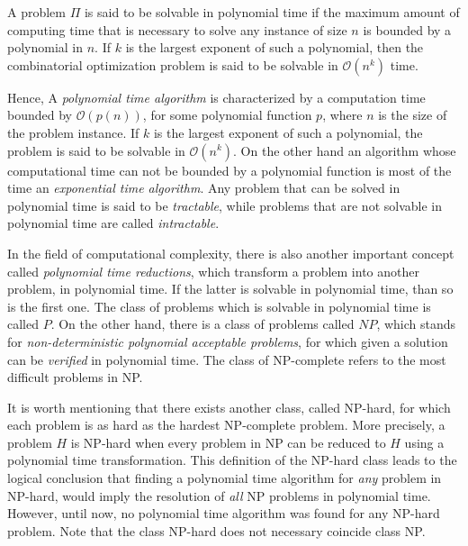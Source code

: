 A problem $\Pi$ is said to be solvable in polynomial time if the maximum amount of computing time that is necessary to solve any instance of size $n$ 
is bounded by a polynomial in $n$. If $k$ is the largest exponent of such a polynomial,
then the combinatorial optimization problem is said to be solvable in $\mathcal{O}(n^k)$ time.

Hence, A \textit{polynomial time algorithm} is characterized by a computation time bounded by $\mathcal{O}(p(n))$, for some polynomial function $p$, 
where $n$ is the size of the problem instance. If $k$ is the largest exponent of such a polynomial, 
the problem is said to be solvable in $\mathcal{O}(n^k)$. On the other hand
an algorithm whose computational time can not be bounded by a polynomial function is most of the time an \textit{exponential time algorithm}.
Any problem that can be solved in polynomial time is said to be \textit{tractable}, while problems that 
are not solvable in polynomial time are called \textit{intractable}.

In the field of computational complexity, there is also another important concept called \textit{polynomial time reductions},
which transform a problem into another problem, in polynomial time. If the latter 
is solvable in polynomial time, than so is the first one. The class of problems which is solvable in polynomial time is called $P$.
On the other hand, there is a class of problems called $NP$, which stands for \textit{non-deterministic polynomial acceptable problems},
for which given a solution can be \textit{verified} in polynomial time.    
The class of NP-complete refers to the most difficult problems in NP.

It is worth mentioning that there exists another class, called NP-hard, for which each problem is as hard as the hardest NP-complete problem.
More precisely, a problem $H$ is NP-hard when every problem in NP can be reduced to $H$ using a polynomial time transformation.
This definition of the NP-hard class leads to the logical conclusion that finding a polynomial time algorithm for \textit{any} problem in NP-hard,
would imply the resolution of \textit{all} NP problems in polynomial time. However, until now, no polynomial time algorithm was found for any NP-hard problem.
Note that the class NP-hard does not necessary coincide  class NP.

